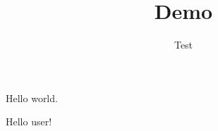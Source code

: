 \documentclass[12pt]{article}
\author{Test}
\title{Demo}
\begin{document}
\maketitle
Hello world.\par
Hello user!
\end{document}
